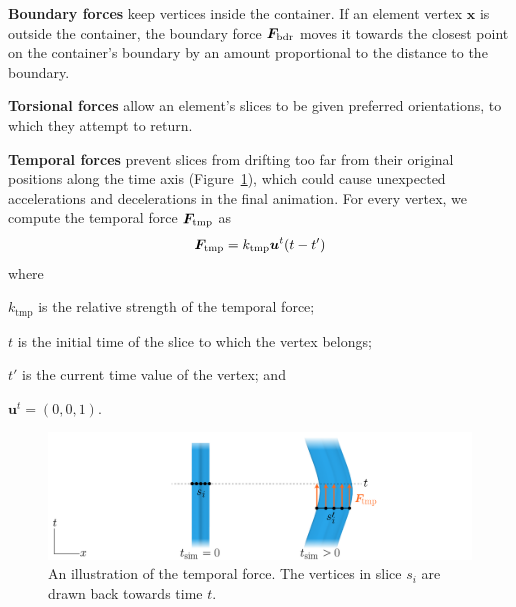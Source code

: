 \newtext
{
\textbf{Boundary forces} keep vertices inside the container.
If an element vertex $\bm{x}$
is outside the container, the boundary force $\bm{F}_\mathrm{bdr}$ moves
it towards the closest point
on the container's boundary by an amount proportional to the distance to
the boundary.
}

\newtext
{
\textbf{Torsional forces} allow an element's slices to be given
preferred orientations, to which they attempt to return.
}

\newtext
{
\textbf{Temporal forces} prevent slices from drifting too far
from their original positions along the time axis
(Figure~\ref{fig_animationpak_t_force}), which could cause unexpected accelerations
and decelerations in the final animation.  For every vertex, we compute
the temporal force $\bm{F}_\mathrm{tmp}$ as
\begin{equation}
\bm{F}_\mathrm{tmp} = k_\mathrm{tmp} \bm{u}^t(t - t')
\end{equation}
where
\begin{packeddescriptions}
  \item[$k_\mathrm{tmp}$] is the relative strength of the temporal force;
  \item[$t$] is the initial time of the slice to which the vertex belongs;
  \item[$t'$] is the current time value of the vertex; and
  \item[$\bm{u}^t = (0,0,1)$.]
\end{packeddescriptions}
}

\begin{figure}
\centering
\includegraphics[width=1.0\textwidth]{figures/animationpak/t_force.pdf} 
\caption[An illustration of the temporal forces]
{\label{fig_animationpak_t_force} 
An illustration of the temporal force.  The vertices in slice
$s_i$ are drawn back towards time $t$.
}
\end{figure}


